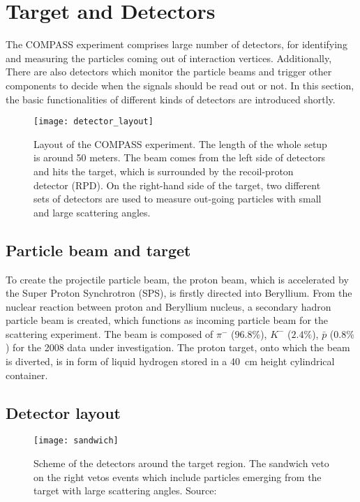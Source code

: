 \section{Target and Detectors}
The COMPASS experiment comprises large number of detectors, for identifying and measuring the particles coming out of interaction vertices. Additionally, There are also detectors which monitor the particle beams and trigger other components to decide when the signals should be read out or not. In this section, the basic functionalities of different kinds of detectors are introduced shortly. 

\begin{figure*}[!ht]
	\centering
	\texttt{[image: detector\_layout]}
	\caption{Layout of the COMPASS experiment. The length of the whole setup is around 50 meters. The beam comes from the left side of detectors and hits the target, which is surrounded by the recoil-proton detector (RPD). On the right-hand side of the target, two different sets of detectors are used to measure out-going particles with small and large scattering angles.\cite{Henri}}
	\label{fig:detec_layout}	
\end{figure*}

\subsection{Particle beam and target}
To create the projectile particle beam, the proton beam, which is accelerated by the Super Proton Synchrotron (SPS), is firstly directed into Beryllium. From the nuclear reaction between proton and Beryllium nucleus, a secondary hadron particle beam is created, which functions as incoming particle beam for the scattering experiment. The beam is composed of $\pi^-$ ($96.8\%$), $K^-$ ($2.4\%$), $\bar{p}$ ($0.8\%$) for the 2008 data under investigation\cite{Henri}. The proton target, onto which the beam is diverted, is in form of liquid hydrogen stored in a \SI{40}{\centi\meter} height cylindrical container. 

\subsection{Detector layout}
\label{subsec:Detector_layout}
\begin{figure}[!th]
	\centering
	\texttt{[image: sandwich]}
	\caption{Scheme of the detectors around the target region. The sandwich veto on the right vetos events which include particles emerging from the target with large scattering angles. Source: \cite{sandwich}}
	\label{fig:sandwich}
\end{figure}

